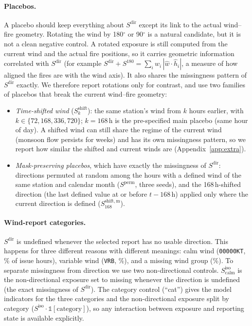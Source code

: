 \paragraph{Placebos.}
A placebo should keep everything about $S^{\mathrm{dir}}$ except its link to the actual wind--fire
geometry. Rotating the wind by 180$^\circ$ or 90$^\circ$ is a natural candidate, but it is not a
clean negative control. A rotated exposure is still computed from the current wind and the actual
fire positions, so it carries geometric information correlated with $S^{\mathrm{dir}}$ (for
example $S^{\mathrm{dir}}+S^{180}=\sum_i w_i\,|\hat w\cdot\hat h_i|$, a measure of how aligned the
fires are with the wind axis). It also shares the missingness pattern of $S^{\mathrm{dir}}$
exactly. We therefore report rotations only for contrast, and use two families of placebos that
break the current wind--fire geometry:
\begin{itemize}
  \item \emph{Time-shifted wind} ($S^{\mathrm{shift}}_k$): the same station's wind from $k$ hours
        earlier, with $k\in\{72, 168, 336, 720\}$; $k=168$\,h is the pre-specified main placebo
        (same hour of day). A shifted wind can still share the regime of the current wind
        (monsoon flow persists for weeks) and has its own missingness pattern, so we report how
        similar the shifted and current winds are (Appendix~\ref{app:extra}).
  \item \emph{Mask-preserving placebos}, which have exactly the missingness of $S^{\mathrm{dir}}$:
        directions permuted at random among the hours with a defined wind of the same station
        and calendar month ($S^{\mathrm{perm}}$, three seeds), and the 168\,h-shifted direction
        (the last defined value at or before $t-168$\,h) applied only where the current
        direction is defined ($S^{\mathrm{shift,m}}_{168}$).
\end{itemize}

\paragraph{Wind-report categories.}
$S^{\mathrm{dir}}$ is undefined whenever the selected report has no usable direction. This
happens for three different reasons with different meanings: calm wind (\texttt{00000KT},
\% of issue hours), variable wind (\texttt{VRB}, \%), and a
missing wind group (\%). To separate missingness from direction we use two
non-directional controls. $S^{\mathrm{iso}}_{\mathrm{calm}}$ is the non-directional exposure set
to missing whenever the direction is undefined (the exact missingness of $S^{\mathrm{dir}}$). The
category control (``cat'') gives the model indicators for the three categories and the
non-directional exposure split by category ($S^{\mathrm{iso}}\cdot\mathbb 1[\text{category}]$),
so any interaction between exposure and reporting state is available explicitly.

